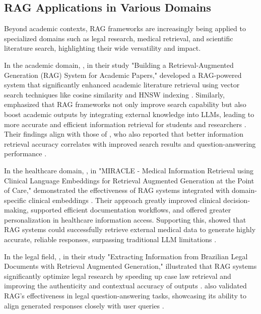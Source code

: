 \begin{refsection}
\subsection{RAG Applications in Various Domains}

\hspace{1cm}Beyond academic contexts, RAG frameworks are increasingly being applied to specialized domains such as legal research, medical retrieval, and scientific literature search, highlighting their wide versatility and impact.

\hspace{0.4cm}In the academic domain, \citeauthor{grigoryan2024building} \citeyear{grigoryan2024building}, in their study "Building a Retrieval-Augmented Generation (RAG) System for Academic Papers," developed a RAG-powered system that significantly enhanced academic literature retrieval using vector search techniques like cosine similarity and HNSW indexing \cite{grigoryan2024building}. Similarly, \citeauthor{song2024travelrag} \citeyear{song2024travelrag} emphasized that RAG frameworks not only improve search capability but also boost academic outputs by integrating external knowledge into LLMs, leading to more accurate and efficient information retrieval for students and researchers \cite{song2024travelrag}. Their findings align with those of \citeauthor{karpukhin2020dense} \citeyear{karpukhin2020dense}, who also reported that better information retrieval accuracy correlates with improved search results and question-answering performance \cite{karpukhin2020dense}.


\hspace{0.4cm}In the healthcare domain, \citeauthor{arzideh2024miracle} \citeyear{arzideh2024miracle}, in "MIRACLE - Medical Information Retrieval using Clinical Language Embeddings for Retrieval Augmented Generation at the Point of Care," demonstrated the effectiveness of RAG systems integrated with domain-specific clinical embeddings \cite{arzideh2024miracle}. Their approach greatly improved clinical decision-making, supported efficient documentation workflows, and offered greater personalization in healthcare information access. Supporting this, \citeauthor{amugongo2024retrieval} \citeyear{amugongo2024retrieval} showed that RAG systems could successfully retrieve external medical data to generate highly accurate, reliable responses, surpassing traditional LLM limitations \cite{amugongo2024retrieval}.

\hspace{0.4cm}In the legal field, \citeauthor{aquino2024extracting} \citeyear{aquino2024extracting}, in their study "Extracting Information from Brazilian Legal Documents with Retrieval Augmented Generation," illustrated that RAG systems significantly optimize legal research by speeding up case law retrieval and improving the authenticity and contextual accuracy of outputs \cite{aquino2024extracting}. \citeauthor{ryu2023retrieval} \citeyear{ryu2023retrieval} also validated RAG's effectiveness in legal question-answering tasks, showcasing its ability to align generated responses closely with user queries \cite{ryu2023retrieval}.


\end{refsection}
